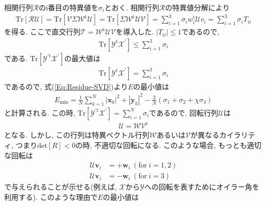 相関行列$\mathcal{R}$のi番目の特異値を$\sigma_{i}$とおく. 
相関行列$\mathcal{R}$の特異値分解により
\begin{align}
  \mathrm{Tr} [ \mathcal{R} \mathcal{U} ]
=
  \mathrm{Tr} [ \mathcal{V} \Sigma \mathcal{W}^{\mathrm{t}} \mathcal{U} ]
=
  \mathrm{Tr} [ \Sigma \mathcal{W}^{\mathrm{t}} \mathcal{U} \mathcal{V} ]
=
  \sum_{i=1}^{3} \sigma_{i} w_{i}^{\mathrm{t}} \mathcal{U} v_{i}
=
  \sum_{i=1}^{3} \sigma_{i} T_{ii}
\end{align}
を得る. 
ここで直交行列$\mathcal{T} = \mathcal{W}^{\mathrm{t}} \mathcal{U} \mathcal{V}$を導入した.
$|T_{ii}| \le 1$であるので,
\begin{align}
 \mathrm{Tr} [ \mathcal{Y}^{\mathrm{t}} \mathcal{X}^{\prime} ] 
 \le
 \sum_{i=1}^{3} \sigma_{i}
\end{align}
である.
$\mathrm{Tr}[\mathcal{Y}^{\prime \mathrm{t}} \mathcal{X}^{\prime}]$の最大値は
\begin{align}
  \mathrm{Tr} [ \mathcal{Y}^{\mathrm{t}} \mathcal{X}^{\prime} ] 
  =
  \sum_{i=1}^{3} \sigma_{i}
 \end{align}
であるので, 式(\ref{Eq:Residue-SVD})より$E$の最小値は
\begin{align}
  E_{\mathrm{min}} 
=
   \frac{1}{N} \sum_{k=1}^{N} |\mathbf{x}_{k}|^{2} + |\mathbf{y}_{k}|^{2} 
 - \frac{2}{N} (\sigma_{1} + \sigma_{2} + \chi\sigma_{3})
\end{align}
と計算される. 
この時, $\mathrm{Tr}[\mathcal{Y}^{\prime \mathrm{t}} \mathcal{X}^{\prime}] = \sum_{i=1}^{N} \sigma_{i}$であるので, 回転行列$\mathcal{U}$は
\begin{align}
 \mathcal{U} = \mathcal{W} \mathcal{V}^{\mathrm{t}}
\end{align}
となる.
しかし, この行列は特異ベクトル行列$\mathcal{W}$あるいは$\mathcal{V}$が異なるカイラリティ, つまり$\mathrm{det} [R] < 0$の時, 不適切な回転になる. 
このような場合, もっとも適切な回転は
\begin{align}
 \mathcal{U} \mathbf{v}_{i} &= + \mathbf{w}_{i} ~ (\mathrm{for}~ i = 1, 2) \\ 
 \mathcal{U} \mathbf{v}_{i} &= - \mathbf{w}_{i} ~ (\mathrm{for}~ i = 3)
\end{align}
で与えられることが示せる(例えば, $\mathcal{X}$から$\mathcal{Y}$への回転を表すためにオイラー角を利用する).
このような理由で$E$の最小値は
